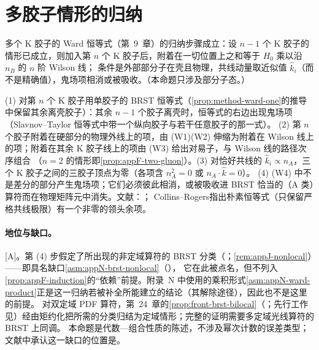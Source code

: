\section{多胶子情形的归纳}\label{sec:appF-induction}

\begin{proposition}\label{prop:appF-induction}
多个 K 胶子的 Ward 恒等式（第~9~章）的归纳步骤成立：设 $n-1$ 个 K 胶子的情形已成立，则加入第 $n$ 个 K 胶子后，附着在一切位置上之和等于 $H_0$ 乘以沿 $n_B$ 的 $n$ 阶 Wilson 线；
条件是外部部分子在壳且物理，共线动量取近似值 $\hat k_i$（而不是精确值），鬼场项相消或被吸收。（本命题只涉及部分子态。）
\end{proposition}

\begin{proofsketch}
(1) 对第 $n$ 个 K 胶子用单胶子的 BRST 恒等式（\cref{prop:method-ward-one}的推导中保留其余离壳胶子）：其余 $n-1$ 个胶子离壳时，恒等式的右边出现鬼场项（Slavnov--Taylor 恒等式中带一个纵向胶子与若干任意胶子的那一式）。
(2) 第 $n$ 个胶子附着在硬部分的物理外线上的项，由 (W1)(W2) 伸缩为附着在 Wilson 线上的项；附着在其余 K 胶子线上的项由 (W3) 给出对易子，与 Wilson 线的路径次序组合
（$n=2$ 的情形即\cref{prop:appF-two-gluon}）。(3) 对恰好共线的 $\hat k_i\propto n_A$，三个 K 胶子之间的三胶子顶点为零（各项含 $n_A^2=0$ 或 $n_A\cdot\hat k=0$）。
(4) (W4) 中不是差分的部分产生鬼场项；它们必须彼此相消，或被吸收进 BRST 恰当的（A 类）算符而在物理矩阵元中消失。文献：\cite[第~11.9、11.3.2~节]{Collins2011}；
Collins--Rogers\cite{Collins:2008sg}指出朴素恒等式（只保留严格共线极限）有一个非零的领头余项。
\end{proofsketch}

\paragraph{地位与缺口。}[A]。第 (4) 步假定了所出现的非定域算符的 BRST 分类（\cite[第~11.3.2~节]{Collins2011}；\cref{rem:appJ-nonlocal}）——即具名缺口\cref{asm:appN-brst-nonlocal}（\tagC），
它在此被点名，但不列入\cref{prop:appF-induction}的“依赖”前提。附录~N 中使用的乘积形式\cref{asm:appN-ward-product}正是这一归纳若被补全所能建立的结论（其解除途径），因此也不是这里的前提。
对双定域 PDF 算符，第~24~章的\cref{prop:front-brst-bilocal}（\tagA；先行工作见\cite{Braun:2019qtp}）经由矩约化把所需的分类归结为定域情形；完整的证明需要多定域光线算符的 BRST 上同调。
本命题是代数—组合性质的陈述，不涉及幂次计数的误差类型；文献中承认这一缺口的位置是\cite[第~11.3.2~节，第~410~页]{Collins2011}。

